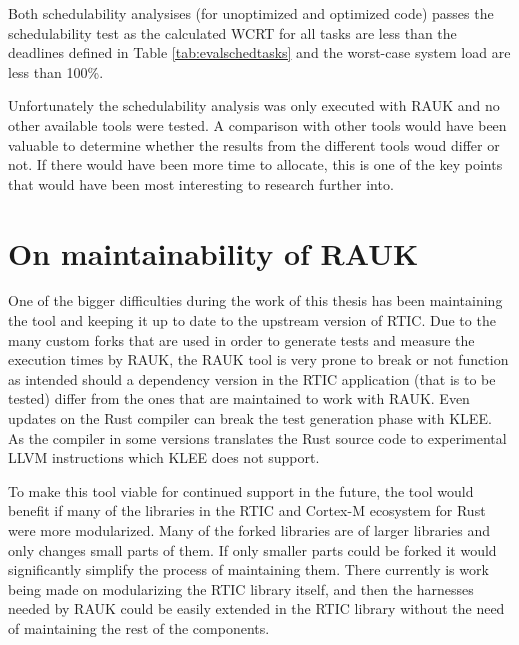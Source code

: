 Both schedulability analysises (for unoptimized and optimized code) passes the
schedulability test as the calculated WCRT for all tasks are less than
the deadlines defined in Table \ref{tab:evalschedtasks} and the worst-case
system load are less than 100\%.

Unfortunately the schedulability analysis was only executed with RAUK and no
other available tools were tested. A comparison with other tools would have
been valuable to determine whether the results from the different tools woud
differ or not. If there would have been more time to allocate, this is one of
the key points that would have been most interesting to research further into.

\section{On maintainability of RAUK}
One of the bigger difficulties during the work of this thesis has been
maintaining the tool and keeping it up to date to the upstream version of RTIC.
Due to the many custom forks that are used in order to generate tests and
measure the execution times by RAUK, the RAUK tool is very prone to break or
not function as intended should a dependency version in the RTIC application
(that is to be tested) differ from the ones that are maintained to work with
RAUK. Even updates on the Rust compiler can break the test generation phase
with KLEE. As the compiler in some versions translates the Rust source code to
experimental LLVM instructions which KLEE does not support.

To make this tool viable for continued support in the future, the tool would
benefit if many of the libraries in the RTIC and Cortex-M ecosystem for Rust
were more modularized. Many of the forked libraries are of larger libraries and
only changes small parts of them. If only smaller parts could be forked it
would significantly simplify the process of maintaining them. There currently
is work being made on modularizing the RTIC library itself, and then the
harnesses needed by RAUK could be easily extended in the RTIC library
without the need of maintaining the rest of the components.
